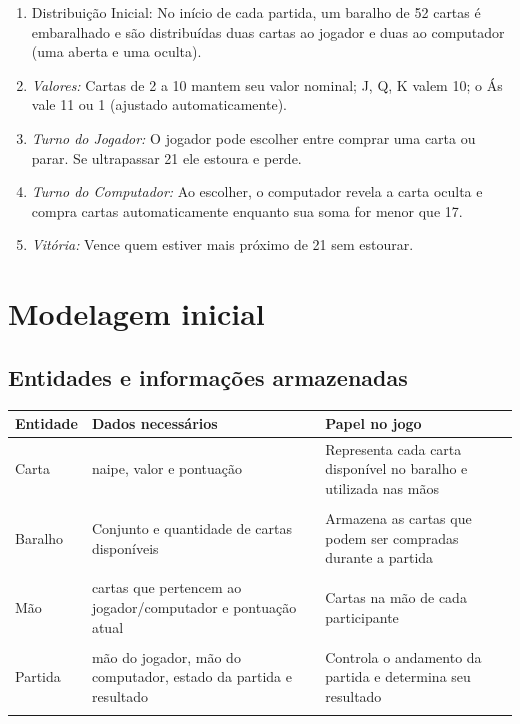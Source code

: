 \documentclass[11pt]{article}
\begin{document}
\begin{enumerate}
    \item \textit{}{Distribuição Inicial:} No início de cada partida, um baralho de 52 cartas é embaralhado e são distribuídas duas cartas ao jogador e duas ao computador (uma aberta e uma oculta).
    \item \textit{Valores:} Cartas de 2 a 10 mantem seu valor nominal; J, Q, K valem 10; o Ás vale 11 ou 1 (ajustado automaticamente).
    \item \textit{Turno do Jogador:} O jogador pode escolher entre comprar uma carta ou parar. Se ultrapassar 21 ele estoura e perde.
    \item \textit{Turno do Computador:} Ao escolher, o computador revela a carta oculta e compra cartas automaticamente enquanto sua soma for menor que 17.
    \item \textit{Vitória:} Vence quem estiver mais próximo de 21 sem estourar.
    
\end{enumerate}
\AnswerSpace{5mm}

\vspace{2mm}
\section{Modelagem inicial}
\subsection{Entidades e informações armazenadas}
\begin{tabularx}{\textwidth}{X X X}
  \toprule
  Entidade & Dados necessários & Papel no jogo \\
  \midrule
   Carta & naipe, valor e pontuação & Representa cada carta disponível no baralho e utilizada nas mãos\\
   \\
   Baralho & Conjunto e quantidade de cartas disponíveis & Armazena as cartas que podem ser compradas durante a partida \\
   \\
   Mão & cartas que pertencem ao jogador/computador e pontuação atual & Cartas na mão de cada participante \\
   \\
   Partida & mão do jogador, mão do computador, estado da partida e resultado & Controla o andamento da partida e determina seu resultado\\
   \\
  \bottomrule
\end{tabularx}
\end{document}
